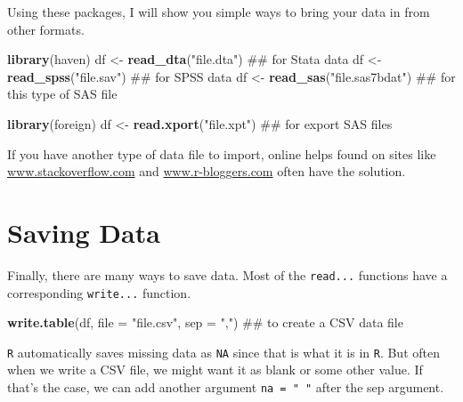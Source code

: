 \documentclass[]{tufte-book}
\newenvironment{Shaded}{}{}
\newcommand{\KeywordTok}[1]{\textcolor[rgb]{0.00,0.44,0.13}{\textbf{#1}}}
\newcommand{\DataTypeTok}[1]{\textcolor[rgb]{0.56,0.13,0.00}{#1}}
\newcommand{\StringTok}[1]{\textcolor[rgb]{0.25,0.44,0.63}{#1}}
\newcommand{\NormalTok}[1]{#1}
\theoremstyle{definition}
\theoremstyle{definition}
\theoremstyle{remark}
\begin{document}
Using these packages, I will show you simple ways to bring your data in
from other formats.

\begin{Shaded}
\begin{Highlighting}[]
\KeywordTok{library}\NormalTok{(haven)}
\NormalTok{df <-}\StringTok{ }\KeywordTok{read_dta}\NormalTok{(}\StringTok{"file.dta"}\NormalTok{)  ## for Stata data}
\NormalTok{df <-}\StringTok{ }\KeywordTok{read_spss}\NormalTok{(}\StringTok{"file.sav"}\NormalTok{)  ## for SPSS data}
\NormalTok{df <-}\StringTok{ }\KeywordTok{read_sas}\NormalTok{(}\StringTok{"file.sas7bdat"}\NormalTok{)  ## for this type of SAS file}
\end{Highlighting}
\end{Shaded}

\begin{Shaded}
\begin{Highlighting}[]
\KeywordTok{library}\NormalTok{(foreign)}
\NormalTok{df <-}\StringTok{ }\KeywordTok{read.xport}\NormalTok{(}\StringTok{"file.xpt"}\NormalTok{)  ## for export SAS files}
\end{Highlighting}
\end{Shaded}

If you have another type of data file to import, online helps found on
sites like \url{www.stackoverflow.com} and \url{www.r-bloggers.com}
often have the solution.

\section*{Saving Data}\label{saving-data}

Finally, there are many ways to save data. Most of the \texttt{read...}
functions have a corresponding \texttt{write...} function.

\begin{Shaded}
\begin{Highlighting}[]
\KeywordTok{write.table}\NormalTok{(df, }\DataTypeTok{file =} \StringTok{"file.csv"}\NormalTok{, }\DataTypeTok{sep =} \StringTok{","}\NormalTok{)  ## to create a CSV data file}
\end{Highlighting}
\end{Shaded}

\texttt{R} automatically saves missing data as \texttt{NA} since that is
what it is in \texttt{R}. But often when we write a CSV file, we might
want it as blank or some other value. If that's the case, we can add
another argument \texttt{na\ =\ "\ "} after the sep argument.
\end{document}
